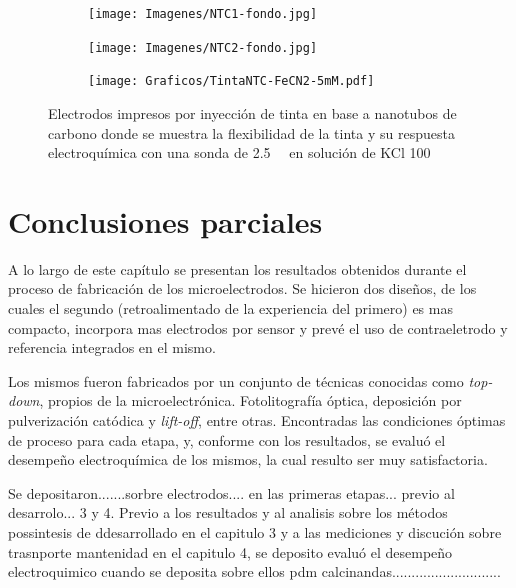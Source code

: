 { 	  	%
 	  			\begin{figure}[th]
		 	   	    \begin{subfigure}[t]{0.25\textwidth}
			       	\texttt{[image: Imagenes/NTC1-fondo.jpg]}
			   		\end{subfigure}
			   		\begin{subfigure}[t]{0.25\textwidth}
			       	\texttt{[image: Imagenes/NTC2-fondo.jpg]}
			   		\end{subfigure}
			   		\begin{subfigure}[t]{0.43\textwidth}
			   	    \texttt{[image: Graficos/TintaNTC-FeCN2-5mM.pdf]}
			   		\end{subfigure}
					 \caption[Electrodos de NTC flexibles.]{Electrodos impresos por inyección de tinta en base a nanotubos de carbono donde se muestra la flexibilidad de la tinta y su respuesta electroquímica con una sonda de \fe\space \SI{2.5}{\milli\Molar} en solución de KCl \SI{100}{\milli\Molar}}
					 \label{fig:tintas}	
				     \end{figure}
 		

\section{Conclusiones parciales}

	A lo largo de este capítulo se presentan los resultados obtenidos durante el proceso de fabricación de los microelectrodos. Se hicieron dos diseños, de los cuales el segundo (retroalimentado de la experiencia del primero) es mas compacto, incorpora mas electrodos por sensor y prevé el uso de contraeletrodo y referencia integrados en el mismo.
	
	Los mismos fueron fabricados por un conjunto de técnicas conocidas como \textit{top-down}, propios de la microelectrónica. Fotolitografía óptica, deposición por pulverización catódica y \textit{lift-off}, entre otras. Encontradas las condiciones óptimas de proceso para cada etapa, y, conforme con los resultados, se evaluó el desempeño electroquímica de los mismos, la cual resulto ser muy satisfactoria. 

	Se depositaron.......sorbre electrodos.... en las primeras etapas... previo al desarrolo... 3 y 4.
	Previo a los resultados y al analisis sobre los métodos possintesis de \pdm ddesarrollado en el capitulo 3 y a las mediciones y discución sobre trasnporte mantenidad en el capitulo 4, se deposito evaluó el desempeño electroquimico cuando se deposita sobre ellos pdm calcinandas............................



}
